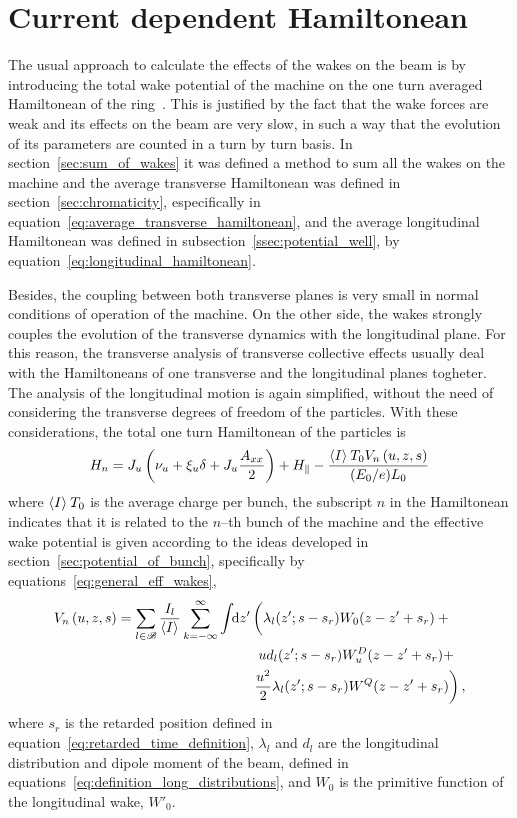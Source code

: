 \section{Current dependent Hamiltonean}

    The usual approach to calculate the effects of the wakes on the beam is by introducing the total wake potential of the machine on the one turn averaged Hamiltonean of the ring~\cite{Berg1996,Lindberg2016}. This is justified by the fact that the wake forces are weak and its effects on the beam are very slow, in such a way that the evolution of its parameters are counted in a turn by turn basis. In section~\ref{sec:sum_of_wakes} it was defined a method to sum all the wakes on the machine and the average transverse Hamiltonean was defined in section~\ref{sec:chromaticity}, especifically in equation~\eqref{eq:average_transverse_hamiltonean}, and the average longitudinal Hamiltonean was defined in subsection~\ref{ssec:potential_well}, by equation~\eqref{eq:longitudinal_hamiltonean}.

    Besides, the coupling between both transverse planes is very small in normal conditions of operation of the machine. On the other side, the wakes strongly couples the evolution of the transverse dynamics with the longitudinal plane. For this reason, the transverse analysis of transverse collective effects usually deal with the Hamiltoneans of one transverse and the longitudinal planes togheter. The analysis of the longitudinal motion is again simplified, without the need of considering the transverse degrees of freedom of the particles. With these considerations, the total one turn Hamiltonean of the particles is
    \begin{align}\label{eq:current_depend_hamiltonean}
        H_n = J_u\left(\nu_u + \xi_u\delta + J_u\frac{A_{xx}}{2}\right) +
                H_{\parallel} - \frac{\left\langle I \right\rangle_{{}}T_0V_n\left(u, z, s\right)}{(E_0/e)L_0}
    \end{align}
    where $\left\langle I \right\rangle_{{}}T_0$ is the average charge per bunch, the subscript $n$ in the Hamiltonean indicates that it is related to the $n$--th bunch of the machine and the effective wake potential is given according to the ideas developed in section~\ref{sec:potential_of_bunch}, specifically by equations~\eqref{eq:general_eff_wakes},
    \begin{align}\label{eq:generalwake}
        V_n\funcof{u, z, s} =\nonumber \sum_{l\in\mathscr{B}}\frac{I_l}{\average{I}}\sum_{k=-\infty}^\infty\udefint{z'}{
        &\left(\lambda_l(z'; s - s_r) W_0(z-z' + s_r) + \vphantom{\frac{u^2}{2}}\right.\\\nonumber
        &\hphantom{u}ud_l(z'; s -s_r) W^D_u(z-z' + s_r) +\\
        &\left. \frac{u^2}{2}\lambda_l(z'; s - s_r) W^Q(z-z' + s_r)\right)},
    \end{align}
    where $s_r$ is the retarded position defined in equation~\eqref{eq:retarded_time_definition}, $\lambda_l$ and $d_l$ are the longitudinal distribution and dipole moment of the beam, defined in equations~\eqref{eq:definition_long_distributions}, and $W_0$ is the primitive function of the longitudinal wake, $W'_0$.


